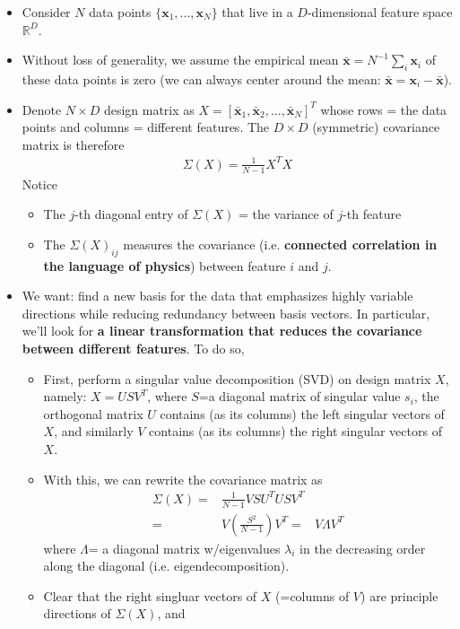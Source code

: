 \documentclass[norsk,a4paper,11pt]{article}
\begin{document}
\begin{itemize}
\begin{itemize}
		\item Consider $N$ data points $\{ \bm{x}_1,..., \bm{x}_N \}$ that live in a $D$-dimensional feature space $\mathbb{R}^D$. 
		\item Without loss of generality, we assume the empirical mean $\bar{\bm{x}} = N^{-1} \sum_i \bm{x}_i $ of these data points is zero (we can always center around the mean: $\bar{\bm{x}} = \bm{x}_i - \bar{\bm{x}}$).
		\item Denote $N\times D$ design matrix as $X = [\bar{\bm{x}}_1, \bar{\bm{x}}_2, ..., \bar{\bm{x}}_N]^T$ whose rows = the data points and columns = different features. The $D\times D$ (symmetric) covariance matrix is therefore
		\begin{align}
			\Sigma (X) = \frac{1}{N-1} X^T X
		\end{align}
		Notice 
		\begin{itemize}
			\item The $j$-th diagonal entry of $\Sigma (X)$ = the variance of $j$-th feature 
			\item The $\Sigma (X)_{ij}$ measures the covariance (i.e. \textbf{connected correlation in the language of physics}) between feature $i$ and $j$.
		\end{itemize}
		\item We want: find a new basis for the data that emphasizes highly variable directions while reducing redundancy between basis vectors. In particular, we'll look for \textbf{a linear transformation that reduces the covariance between different features}. To do so, 
		\begin{itemize}
			\item First, perform a singular value decomposition (SVD) on design matrix $X$, namely: $X=USV^T$, where $S$=a diagonal matrix of singular value $s_i$, the orthogonal matrix $U$ contains (as its columns) the left singular vectors of $X$, and similarly $V$ contains (as its columns) the right singular vectors of $X$.
			\item With this, we can rewrite the covariance matrix as
			\begin{align}
				\Sigma (X) =& \frac{1}{N-1} VSU^T USV^T \\
				=& V (\frac{S^2}{N-1}) V^T
				=& V \Lambda V^T
			\end{align}
			where $\Lambda$= a diagonal matrix w/eigenvalues $\lambda_i$ in the decreasing order along the diagonal (i.e. eigendecomposition).
			\item Clear that the right singluar vectors of $X$ (=columns of $V$) are principle directions of $\Sigma (X)$, and 

\end{itemize}
\end{itemize}
\end{itemize}
\end{document}
